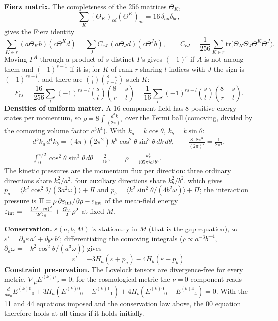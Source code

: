 \documentclass[10pt,a4paper]{article}
\begin{document}
\textbf{Fierz matrix.} The completeness of the 256 matrices $\Theta_K$,
\begin{equation*}
\sum_K(\Theta_K)_{cd}(\Theta^K)_{ab}=16\,\delta_{ad}\delta_{bc},
\end{equation*}
gives the Fierz identity
\begin{equation*}
\sum_{K\in r}(a\Theta_Kb)(c\Theta^Kd)=\sum_JC_{rJ}\,(a\Theta_Jd)(c\Theta^Jb),\qquad C_{rJ}=\frac1{256}\sum_{K\in r}\mathrm{tr}\big(\Theta_K\Theta_J\Theta^K\Theta^J\big).
\end{equation*}
Moving $\Gamma^{A}$ through a product of $s$ distinct $\Gamma$’s gives $(-1)^s$ if $A$ is not among them and $(-1)^{s-1}$ if it is; for $K$ of rank $r$ sharing $l$ indices with $J$ the sign is $(-1)^{rs-l}$, and there are $\binom sl\binom{8-s}{r-l}$ such $K$:
\begin{equation*}
F_{rs}=\frac{16}{256}\sum_l(-1)^{rs-l}\binom{s}{l}\binom{8-s}{r-l}=\frac1{16}\sum_l(-1)^{rs-l}\binom{s}{l}\binom{8-s}{r-l}.
\end{equation*}
\textbf{Densities of uniform matter.} A 16-component field has 8 positive-energy states per momentum, so $\rho=8\int\frac{d^7k}{(2\pi)^7}$ over the Fermi ball (comoving, divided by the comoving volume factor $a^3b^4$). With $k_a=k\cos\theta$, $k_b=k\sin\theta$:
\begin{gather*}
d^3k_a\,d^4k_b=(4\pi)(2\pi^2)\,k^6\cos^2\theta\sin^3\theta\,dk\,d\theta,\qquad \frac{8\cdot8\pi^3}{(2\pi)^7}=\frac1{2\pi^4},\\ \int_0^{\pi/2}\cos^2\theta\sin^3\theta\,d\theta=\frac2{15},\qquad \rho=\frac{k_F^7}{105\pi^4a^3b^4}.
\end{gather*}
The kinetic pressures are the momentum flux per direction: three ordinary directions share $k_a^2/a^2$, four auxiliary directions share $k_b^2/b^2$, which gives $p_a=\langle k^2\cos^2\theta/(3a^2\omega)\rangle+\Pi$ and $p_b=\langle k^2\sin^2\theta/(4b^2\omega)\rangle+\Pi$; the interaction pressure is $\Pi=\rho\,\partial\varepsilon_{\rm int}/\partial\rho-\varepsilon_{\rm int}$ of the mean-field energy $\varepsilon_{\rm int}=-\frac{(M-m)^2}{2G_S}+\frac{G_V}2\rho^2$ at fixed $M$.

\textbf{Conservation.} $\varepsilon(a,b,M)$ is stationary in $M$ (that is the gap equation), so $\varepsilon'=\partial_a\varepsilon\,a'+\partial_b\varepsilon\,b'$; differentiating the comoving integrals ($\rho\propto a^{-3}b^{-4}$, $\partial_a\omega=-k^2\cos^2\theta/(a^3\omega)$) gives
\begin{equation*}
\varepsilon'=-3H_a(\varepsilon+p_a)-4H_b(\varepsilon+p_b).
\end{equation*}
\textbf{Constraint preservation.} The Lovelock tensors are divergence-free for every metric, $\nabla_\mu E^{(k)\mu}{}_\nu=0$; for the cosmological metric the $\nu=0$ component reads $\frac{d}{dx_0}E^{(k)0}{}_0+3H_a(E^{(k)0}{}_0-E^{(k)1}{}_1)+4H_b(E^{(k)0}{}_0-E^{(k)4}{}_4)=0$. With the 11 and 44 equations imposed and the conservation law above, the 00 equation therefore holds at all times if it holds initially.
\end{document}
